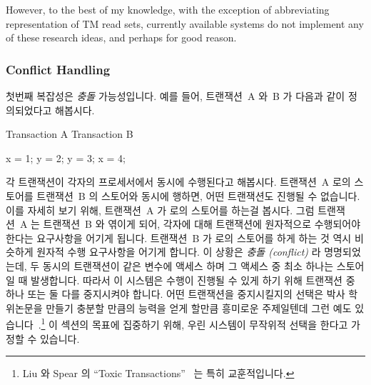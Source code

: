 However, to the best of my knowledge, with the exception of abbreviating
representation of TM read sets, currently available systems do not
implement any of these research ideas, and perhaps for good reason.

\fi

\subsubsection{Conflict Handling}
\label{sec:future:Conflict Handling}

첫번째 복잡성은 \emph{충돌} 가능성입니다.
예를 들어, 트랜잭션~A 와~B 가 다음과 같이 정의되었다고 해봅시다.

\iffalse

The first complication is the possibility of \emph{conflicts}.
For example, suppose that transactions~A and~B are defined as follows:

\fi

\begin{VerbatimU}
Transaction A       Transaction B

x = 1;              y = 2;
y = 3;              x = 4;
\end{VerbatimU}

각 트랜잭션이 각자의 프로세서에서 동시에 수행된다고 해봅시다.
트랜잭션~A  로의 스토어를 트랜잭션~B 의  스토어와 동시에 행하면,
어떤 트랜잭션도 진행될 수 없습니다.
이를 자세히 보기 위해, 트랜잭션~A 가  로의 스토어를 하는걸 봅시다.
그럼 트랜잭션~A 는 트랜잭션~B 와 엮이게 되어, 각자에 대해 트랜잭션에 원자적으로
수행되어야 한다는 요구사항을 어기게 됩니다.
트랜잭션~B 가  로의 스토어를 하게 하는 것 역시 비슷하게 원자적 수행
요구사항을 어기게 합니다.
이 상황은 \emph{충돌 (conflict)} 라 명명되었는데, 두 동시의 트랜잭션이 같은
변수에 액세스 하며 그 액세스 중 최소 하나는 스토어일 때 발생합니다.
따라서 이 시스템은 수행이 진행될 수 있게 하기 위해 트랜잭션 중 하나 또는 둘
다를 중지시켜야 합니다.
어떤 트랜잭션을 중지시킬지의 선택은 박사 학위논문을 만들기 충분할 만큼의 능력을
얻게 할만큼 흥미로운 주제일텐데 그런 예도
있습니다~\cite{EgeAkpinar2011HTM2TLE}.\footnote{
	Liu 와 Spear 의 ``Toxic
	Transactions''~\cite{YujieLiu2011ToxicTransactions} 는 특히
	교훈적입니다.}
이 섹션의 목표에 집중하기 위해, 우린 시스템이 무작위적 선택을 한다고 가정할 수
있습니다.

\iffalse

